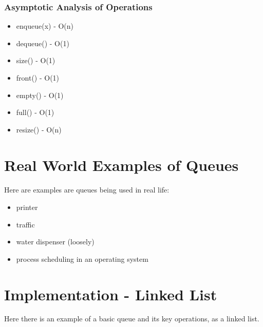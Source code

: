 \documentclass[12pt]{article}
\begin{document}
\subsubsection {Asymptotic Analysis of Operations}
\begin{itemize}
\item enqueue(x) - O(n)
\item dequeue() - O(1)
\item size() - O(1)
\item front() - O(1)
\item empty() - O(1)
\item full() - O(1)
\item resize() - O(n)
\end{itemize}


\section{Real World Examples of Queues}

\paragraph{} Here are examples are queues being used in real life:

\begin{itemize}
\item printer
\item traffic
\item water dispenser (loosely)
\item process scheduling in an operating system
\end{itemize}


\newpage
\section{Implementation - Linked List}

Here there is an example of a basic queue and its key operations, as a linked list.
\end{document}
